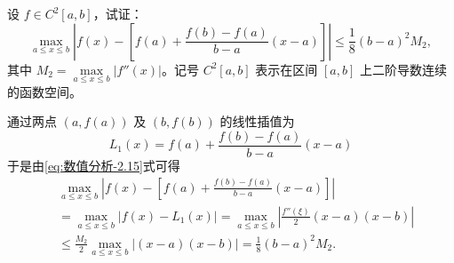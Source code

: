 \documentclass[../../main.tex]{subfiles}
\begin{document}
\begin{example}
设 $f \in C^2[a, b]$，试证： 
\[
\max_{a \leqslant x \leqslant b} \left| f(x) - \left[ f(a) + \frac{f(b) - f(a)}{b - a}(x - a) \right] \right| \leqslant \frac{1}{8}(b - a)^2 M_2,
\]
其中 $M_2 = \max\limits_{a \leqslant x \leqslant b} |f''(x)|$。记号 $C^2[a, b]$ 表示在区间 $[a, b]$ 上二阶导数连续的函数空间。
\end{example}
\begin{solution}
通过两点 $(a, f(a))$ 及 $(b, f(b))$ 的线性插值为 
\[
L_1(x) = f(a) + \frac{f(b) - f(a)}{b - a}(x - a)
\]
于是由\eqref{eq:数值分析-2.15}式可得
\begin{align*}
&\max_{a \leqslant x \leqslant b} \left| f(x) - \left[ f(a) + \frac{f(b) - f(a)}{b - a}(x - a) \right] \right| \\
&= \max_{a \leqslant x \leqslant b} |f(x) - L_1(x)| = \max_{a \leqslant x \leqslant b} \left| \frac{f''(\xi)}{2}(x - a)(x - b) \right| \\
&\leqslant \frac{M_2}{2} \max_{a \leqslant x \leqslant b} |(x - a)(x - b)| = \frac{1}{8}(b - a)^2 M_2.
\end{align*}

\end{solution}
\end{document}
